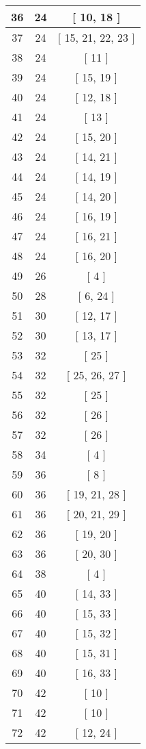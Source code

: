 \begin{center}
\begin{longtable}[H]{|| c c c ||}
\hline
36 & 24 & [ 10, 18 ] \\ 
\hline
37 & 24 & [ 15, 21, 22, 23 ] \\ 
\hline
38 & 24 & [ 11 ] \\ 
\hline
39 & 24 & [ 15, 19 ] \\ 
\hline
40 & 24 & [ 12, 18 ] \\ 
\hline
41 & 24 & [ 13 ] \\ 
\hline
42 & 24 & [ 15, 20 ] \\ 
\hline
43 & 24 & [ 14, 21 ] \\ 
\hline
44 & 24 & [ 14, 19 ] \\ 
\hline
45 & 24 & [ 14, 20 ] \\ 
\hline
46 & 24 & [ 16, 19 ] \\ 
\hline
47 & 24 & [ 16, 21 ] \\ 
\hline
48 & 24 & [ 16, 20 ] \\ 
\hline
49 & 26 & [ 4 ] \\ 
\hline
50 & 28 & [ 6, 24 ] \\ 
\hline
51 & 30 & [ 12, 17 ] \\ 
\hline
52 & 30 & [ 13, 17 ] \\ 
\hline
53 & 32 & [ 25 ] \\ 
\hline
54 & 32 & [ 25, 26, 27 ] \\ 
\hline
55 & 32 & [ 25 ] \\ 
\hline
56 & 32 & [ 26 ] \\ 
\hline
57 & 32 & [ 26 ] \\ 
\hline
58 & 34 & [ 4 ] \\ 
\hline
59 & 36 & [ 8 ] \\ 
\hline
60 & 36 & [ 19, 21, 28 ] \\ 
\hline
61 & 36 & [ 20, 21, 29 ] \\ 
\hline
62 & 36 & [ 19, 20 ] \\ 
\hline
63 & 36 & [ 20, 30 ] \\ 
\hline
64 & 38 & [ 4 ] \\ 
\hline
65 & 40 & [ 14, 33 ] \\ 
\hline
66 & 40 & [ 15, 33 ] \\ 
\hline
67 & 40 & [ 15, 32 ] \\ 
\hline
68 & 40 & [ 15, 31 ] \\ 
\hline
69 & 40 & [ 16, 33 ] \\ 
\hline
70 & 42 & [ 10 ] \\ 
\hline
71 & 42 & [ 10 ] \\ 
\hline
72 & 42 & [ 12, 24 ] \\ 

\end{longtable}
\end{center}
